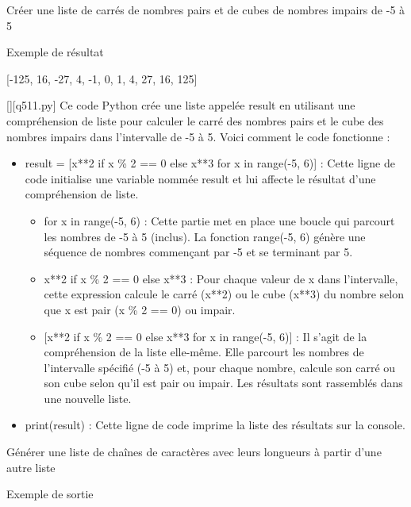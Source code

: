         \question
        Créer une liste de carrés de nombres pairs et de cubes de nombres impairs de -5 à 5

Exemple de résultat

[-125, 16, -27, 4, -1, 0, 1, 4, 27, 16, 125]
        \par
        \begin{solution}
            \renewcommand{\nomfichier}{q511.py}
            \pythonfile{\chemincode \nomfichier}[][\nomfichier]
            Ce code Python crée une liste appelée result en utilisant une compréhension de liste pour calculer le carré des nombres pairs et le cube des nombres impairs dans l'intervalle de -5 à 5. Voici comment le code fonctionne :

  \begin{itemize}
  	\item   result = [x**2 if x \% 2 == 0 else x**3 for x in range(-5, 6)] : Cette ligne de code initialise une variable nommée result et lui affecte le résultat d'une compréhension de liste.
  
     \begin{itemize}
     	\item    for x in range(-5, 6) : Cette partie met en place une boucle qui parcourt les nombres de -5 à 5 (inclus). La fonction range(-5, 6) génère une séquence de nombres commençant par -5 et se terminant par 5.
     	\item         x**2 if x \% 2 == 0 else x**3 : Pour chaque valeur de x dans l'intervalle, cette expression calcule le carré (x**2) ou le cube (x**3) du nombre selon que x est pair (x \% 2 == 0) ou impair.
     	\item{}         [x**2 if x \% 2 == 0 else x**3 for x in range(-5, 6)] : Il s'agit de la compréhension de la liste elle-même. Elle parcourt les nombres de l'intervalle spécifié (-5 à 5) et, pour chaque nombre, calcule son carré ou son cube selon qu'il est pair ou impair. Les résultats sont rassemblés dans une nouvelle liste.
     \end{itemize}
    \item print(result) : Cette ligne de code imprime la liste des résultats sur la console.\end{itemize}
        \end{solution}
        

        \question
        Générer une liste de chaînes de caractères avec leurs longueurs à partir d'une autre liste

Exemple de sortie


